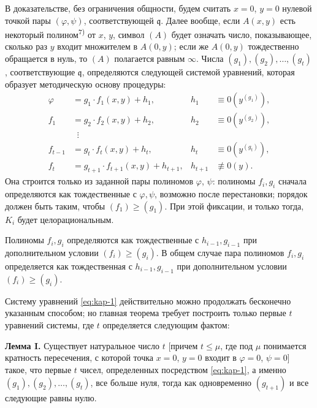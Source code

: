 \documentclass[11pt]{article}
\theoremstyle{plain}
\begin{document}
В доказательстве, без ограничения общности, будем считать $x = 0$,
$y = 0$ нулевой точкой пары $(\varphi, \psi)$, соответствующей
$\mathfrak{q}$. Далее вообще, если $A(x,y)$ есть некоторый
полином\textsuperscript{7)} от $x$, $y$, символ $(A)$ будет означать
число, показывающее, сколько раз $y$ входит множителем в $A(0,y)$;
если же $A(0,y)$ тождественно обращается в нуль, то $(A)$ полагается
равным $\infty$. Числа $(g_{1}), (g_{2}), \ldots, (g_{t})$,
соответствующие $\mathfrak{q}$, определяются следующей системой
уравнений, которая образует методическую основу процедуры:
\begin{equation}\label{eq:kap-1}
\begin{aligned}
\varphi &= g_{1} \cdot f_{1}(x,y) + h_{1}, & h_{1} &\equiv 0(y^{(g_{1})}),\\
f_{1} &= g_{2} \cdot f_{2}(x,y) + h_{2}, & h_{2} &\equiv 0(y^{(g_{2})}),\\
&\;\;\vdots &&\\
f_{t-1} &= g_{t} \cdot f_{t}(x,y) + h_{t}, & h_{t} &\equiv 0(y^{(g_{t})}),\\
f_{t} &= g_{t+1} \cdot f_{t+1}(x,y) + h_{t+1}, & h_{t+1} &\not\equiv 0(y).
\end{aligned}
\end{equation}
Она строится только из заданной пары полиномов $\varphi$, $\psi$:
полиномы $f_{i}, g_{i}$ сначала определяются как тождественные с
$\varphi, \psi$, возможно после перестановки; порядок должен быть
таким, чтобы $(f_{1}) \geq (g_{1})$. При этой фиксации, и только
тогда, $K_{i}$ будет целорациональным.

Полиномы $f_{i}, g_{i}$ определяются как тождественные с
$h_{i-1}, g_{i-1}$ при дополнительном условии
$(f_{i}) \geq (g_{i})$. В общем случае пара полиномов
$f_{i}, g_{i}$ определяется как тождественная с $h_{i-1}, g_{i-1}$
при дополнительном условии $(f_{i}) \geq (g_{i})$.

Систему уравнений \eqref{eq:kap-1} действительно можно продолжать
бесконечно указанным способом; но главная теорема требует построить
только первые $t$ уравнений системы, где $t$ определяется следующим
фактом:

\smallskip
\textbf{Лемма I.} Существует натуральное число $t$ [причем
$t \leq \mu$, где под $\mu$ понимается кратность пересечения, с
которой точка $x = 0$, $y = 0$ входит в $\varphi = 0$, $\psi = 0$]
такое, что первые $t$ чисел, определенных посредством
\eqref{eq:kap-1}, а именно $(g_{1}), (g_{2}), \ldots, (g_{t})$, все
больше нуля, тогда как одновременно $(g_{t+1})$ и все следующие
равны нулю.
\end{document}
